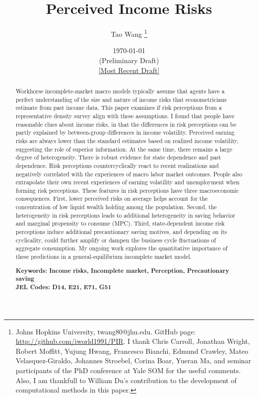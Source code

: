 \begin{titlepage}
 \title{Perceived Income Risks}
 
 \author{Tao Wang \thanks{Johns Hopkins University, twang80@jhu.edu. GitHub page: \url{http://github.com/iworld1991/PIR}. I thank Chris Carroll, Jonathan Wright, Robert Moffitt, Yujung Hwang, Francesco Bianchi, Edmund Crawley, Mateo Velasquez-Giraldo, Johannes Stroebel, Corina Boar, Yueran Ma, and seminar participants of the PhD conference at Yale SOM for the useful comments. Also, I am thankfull to William Du's contribution to the development of computational methods in this paper.}}

\date{\today \\(Preliminary Draft) \\\href{https://github.com/iworld1991/PIR/blob/master/PIR.pdf}{[Most Recent Draft]}}
	\maketitle
	\begin{abstract}
	\begin{singlespace}
		\noindent Workhorse incomplete-market macro models typically assume that agents have a perfect understanding of the size and nature of income risks that econometricians estimate from past income data. This paper examines if risk perceptions from a representative density survey align with these assumptions. I found that people have reasonable clues about income risks, in that the differences in risk perceptions can be partly explained by between-group differences in income volatility. Perceived earning risks are always lower than the standard estimates based on realized income volatility, suggesting the role of superior information. At the same time, there remains a large degree of heterogeneity. There is robust evidence for state dependence and past dependence. Risk perceptions countercyclically react to recent realizations and negatively correlated with the experiences of macro labor market outcomes. People also extrapolate their own recent experiences of earning volatility and unemployment when forming risk perceptions. These features in risk perceptions have three macroeconomic consequences. First, lower perceived risks on average helps account for the concentration of low liquid wealth holding among the population. Second, the heterogeneity in risk perceptions leads to additional heterogeneity in saving behavior and marginal propensity to consume (MPC). Third, state-dependent income risk perceptions induce additional precautionary saving motives, and depending on its cyclicality, could further amplify or dampen the business cycle fluctuations of aggregate consumption. My ongoing work explores the quantitative importance of these predictions in a general-equilibrium incomplete market model. 
	\end{singlespace}
		\noindent \textbf{Keywords: Income risks, Incomplete market, Perception, Precautionary saving } \\
		\noindent \textbf{JEL Codes: D14, E21, E71, G51} 

	\end{abstract}

\end{titlepage}
